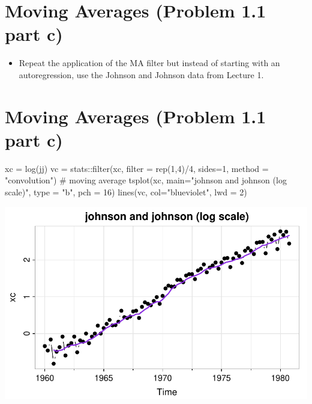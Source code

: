 \documentclass[
  letterpaper,
  DIV=11,
  numbers=noendperiod]{scrreprt}
\newenvironment{Shaded}{\begin{snugshade}}{\end{snugshade}}
\newcommand{\AttributeTok}[1]{\textcolor[rgb]{0.40,0.45,0.13}{#1}}
\newcommand{\CommentTok}[1]{\textcolor[rgb]{0.37,0.37,0.37}{#1}}
\newcommand{\DecValTok}[1]{\textcolor[rgb]{0.68,0.00,0.00}{#1}}
\newcommand{\FunctionTok}[1]{\textcolor[rgb]{0.28,0.35,0.67}{#1}}
\newcommand{\NormalTok}[1]{\textcolor[rgb]{0.00,0.23,0.31}{#1}}
\newcommand{\OtherTok}[1]{\textcolor[rgb]{0.00,0.23,0.31}{#1}}
\newcommand{\SpecialCharTok}[1]{\textcolor[rgb]{0.37,0.37,0.37}{#1}}
\newcommand{\StringTok}[1]{\textcolor[rgb]{0.13,0.47,0.30}{#1}}
\providecommand{\tightlist}{%
  \setlength{\itemsep}{0pt}\setlength{\parskip}{0pt}}\usepackage{longtable,booktabs,array}
\begin{document}
\section{Moving Averages (Problem 1.1 part
c)}\label{moving-averages-problem-1.1-part-c}

\begin{itemize}
\tightlist
\item
  Repeat the application of the MA filter but instead of starting with
  an autoregression, use the Johnson and Johnson data from Lecture 1.
\end{itemize}

\section{Moving Averages (Problem 1.1 part
c)}\label{moving-averages-problem-1.1-part-c-1}

\begin{Shaded}
\begin{Highlighting}[]
\NormalTok{xc }\OtherTok{=} \FunctionTok{log}\NormalTok{(jj)}
\NormalTok{vc }\OtherTok{=}\NormalTok{ stats}\SpecialCharTok{::}\FunctionTok{filter}\NormalTok{(xc, }\AttributeTok{filter =} \FunctionTok{rep}\NormalTok{(}\DecValTok{1}\NormalTok{,}\DecValTok{4}\NormalTok{)}\SpecialCharTok{/}\DecValTok{4}\NormalTok{, }\AttributeTok{sides=}\DecValTok{1}\NormalTok{, }\AttributeTok{method =} \StringTok{"convolution"}\NormalTok{) }\CommentTok{\# moving average}
\FunctionTok{tsplot}\NormalTok{(xc, }\AttributeTok{main=}\StringTok{"johnson and johnson (log scale)"}\NormalTok{, }\AttributeTok{type =} \StringTok{"b"}\NormalTok{, }\AttributeTok{pch =} \DecValTok{16}\NormalTok{)}
\FunctionTok{lines}\NormalTok{(vc, }\AttributeTok{col=}\StringTok{"blueviolet"}\NormalTok{, }\AttributeTok{lwd =} \DecValTok{2}\NormalTok{)}
\end{Highlighting}
\end{Shaded}

\includegraphics{LectureNotes/Lecture2_files/figure-pdf/unnamed-chunk-17-1.pdf}
\end{document}
